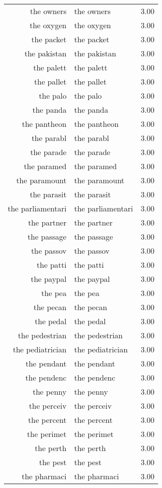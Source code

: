 \begin{table}[ht]
\begin{tabular}{rlr}
  the owners & the owners & 3.00 \\ 
  the oxygen & the oxygen & 3.00 \\ 
  the packet & the packet & 3.00 \\ 
  the pakistan & the pakistan & 3.00 \\ 
  the palett & the palett & 3.00 \\ 
  the pallet & the pallet & 3.00 \\ 
  the palo & the palo & 3.00 \\ 
  the panda & the panda & 3.00 \\ 
  the pantheon & the pantheon & 3.00 \\ 
  the parabl & the parabl & 3.00 \\ 
  the parade & the parade & 3.00 \\ 
  the paramed & the paramed & 3.00 \\ 
  the paramount & the paramount & 3.00 \\ 
  the parasit & the parasit & 3.00 \\ 
  the parliamentari & the parliamentari & 3.00 \\ 
  the partner & the partner & 3.00 \\ 
  the passage & the passage & 3.00 \\ 
  the passov & the passov & 3.00 \\ 
  the patti & the patti & 3.00 \\ 
  the paypal & the paypal & 3.00 \\ 
  the pea & the pea & 3.00 \\ 
  the pecan & the pecan & 3.00 \\ 
  the pedal & the pedal & 3.00 \\ 
  the pedestrian & the pedestrian & 3.00 \\ 
  the pediatrician & the pediatrician & 3.00 \\ 
  the pendant & the pendant & 3.00 \\ 
  the pendenc & the pendenc & 3.00 \\ 
  the penny & the penny & 3.00 \\ 
  the perceiv & the perceiv & 3.00 \\ 
  the percent & the percent & 3.00 \\ 
  the perimet & the perimet & 3.00 \\ 
  the perth & the perth & 3.00 \\ 
  the pest & the pest & 3.00 \\ 
  the pharmaci & the pharmaci & 3.00 \\ 

\end{tabular}
\end{table}
